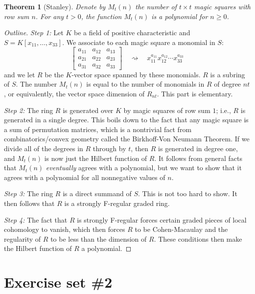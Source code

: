 \documentclass[12pt]{amsart}
\newtheorem{theorem}{Theorem}[section]
\theoremstyle{definition}
\numberwithin{equation}{theorem}
\begin{document}
\begin{theorem}[Stanley] Denote by $M_t(n)$ the number of $t\times t$ magic squares with row sum $n$. For any $t>0$, the function $M_t(n)$ is a polynomial for $n\geq 0$.
\end{theorem}
\begin{proof}[Outline]

\textit{Step 1:} Let $K$ be a field of positive characteristic and $S=K[x_{11}, \dots, x_{33}]$. We associate to each magic square a monomial in $S$:
\[\begin{bmatrix} a_{11} & a_{12} & a_{13} \\  a_{21} & a_{22} & a_{23} \\  a_{31} & a_{32} & a_{33} \end{bmatrix} \quad \rightsquigarrow \quad x_{11}^{a_{11}} x_{12}^{a_{12}} \cdots x_{33}^{a_{33}} \]
and we let $R$ be the $K$-vector space spanned by these monomials. $R$ is a subring of $S$. The number $M_t(n)$ is equal to the number of monomials in $R$ of degree $nt$, or equivalently, the vector space dimension of $R_{nt}$. This part is elementary.

 \textit{Step 2:} The ring $R$ is generated over $K$ by magic squares of row sum $1$; i.e., $R$ is generated in a single degree. This boils down to the fact that any magic square is a sum of permutation matrices, which is a nontrivial fact from combinatorics/convex geometry called the Birkhoff-Von Neumann Theorem. If we divide all of the degrees in $R$ through by $t$, then $R$ is generated in degree one, and $M_t(n)$ is now just the Hilbert function of $R$. It follows from general facts that $M_t(n)$ \textit{eventually} agrees with a polynomial, but we want to show that it agrees with a polynomial for all nonnegative values of $n$.
 
 \textit{Step 3:} The ring $R$ is a direct summand of $S$. This is not too hard to show. It then follows that $R$ is a strongly F-regular graded ring.
 
   \textit{Step 4:} The fact that $R$ is strongly F-regular forces certain graded pieces of local cohomology to vanish, which then forces $R$ to be Cohen-Macaulay and the regularity of $R$ to be less than the dimension of $R$. These conditions then make the Hilbert function of $R$ a polynomial.
\end{proof}



\newpage
\section*{Exercise set \#2}
\end{document}
